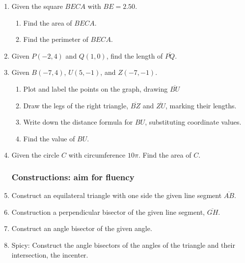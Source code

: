 \documentclass[12pt, oneside]{article}
\begin{document}
\begin{enumerate}
  \item Given the square $BECA$ with $BE=2.50$.
    \begin{enumerate}
      \item Find the area of $BECA$. \vspace{2cm}
      \item Find the perimeter of $BECA$. \vspace{2cm}
    \end{enumerate}

  \item Given $P(-2,4)$ and $Q(1,0)$, find the length of $\overline{PQ}$.
      \vspace{5cm}

  \item Given $B(-7, 4)$, $U(5, -1)$, and $Z(-7, -1)$.
  \begin{enumerate}
    \item Plot and label the points on the graph, drawing $\overline{BU}$
    \item Draw the legs of the right triangle, $\overline{BZ}$ and $\overline{ZU}$, marking their lengths.
    \item Write down the distance formula for $BU$, substituting coordinate values.
    \item Find the value of $BU$.
  \end{enumerate}

  \item Given the circle $C$ with circumference $10\pi$. Find the area of $C$. \vspace{5cm}

\newpage
\subsubsection*{Constructions: aim for fluency}
  \item Construct an equilateral triangle with one side the given line segment $\overline{AB}$.
  \item Construction a perpendicular bisector of the given line segment, $\overline{GH}$.
  \item Construct an angle bisector of the given angle.

  \item Spicy: Construct the angle bisectors of the angles of the triangle and their intersection, the incenter.


\end{enumerate}
\end{document}
